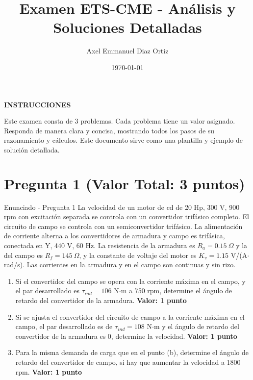 \documentclass[12pt]{article}
\title{Examen ETS-CME - Análisis y Soluciones Detalladas}
\author{Axel Emmanuel Diaz Ortiz}
\date{\today}
\begin{document}
\maketitle

\begin{center}
\large\textbf{INSTRUCCIONES}
\end{center}

Este examen consta de 3 problemas. Cada problema tiene un valor asignado.\\
Responda de manera clara y concisa, mostrando todos los pasos de su razonamiento y cálculos. Este documento sirve como una plantilla y ejemplo de solución detallada.

\vspace{0.5cm}

\section{Pregunta 1 (Valor Total: 3 puntos)}
\begin{problemstatementbox}{Enunciado - Pregunta 1}
La velocidad de un motor de cd de 20 Hp, 300 V, 900 rpm con excitación separada se controla con un convertidor trifásico completo. El circuito de campo se controla con un semiconvertidor trifásico. La alimentación de corriente alterna a los convertidores de armadura y campo es trifásica, conectada en Y, 440 V, 60 Hz. La resistencia de la armadura es $R_a = 0.15\ \Omega$ y la del campo es $R_f = 145\ \Omega$, y la constante de voltaje del motor es $K_v = 1.15$ V/(A$\cdot$rad/s). Las corrientes en la armadura y en el campo son continuas y sin rizo.

\begin{enumerate}[label=\alph*)]
    \item Si el convertidor del campo se opera con la corriente máxima en el campo, y el par desarrollado es $\tau_{ind} = 106$ N$\cdot$m a 750 rpm, determine el ángulo de retardo del convertidor de la armadura. \textbf{Valor: 1 punto}
    
    \item Si se ajusta el convertidor del circuito de campo a la corriente máxima en el campo, el par desarrollado es de $\tau_{ind} = 108$ N$\cdot$m y el ángulo de retardo del convertidor de la armadura es 0, determine la velocidad. \textbf{Valor: 1 punto}
    
    \item Para la misma demanda de carga que en el punto (b), determine el ángulo de retardo del convertidor de campo, si hay que aumentar la velocidad a 1800 rpm. \textbf{Valor: 1 punto}
\end{enumerate}
\end{problemstatementbox}
\end{document}
